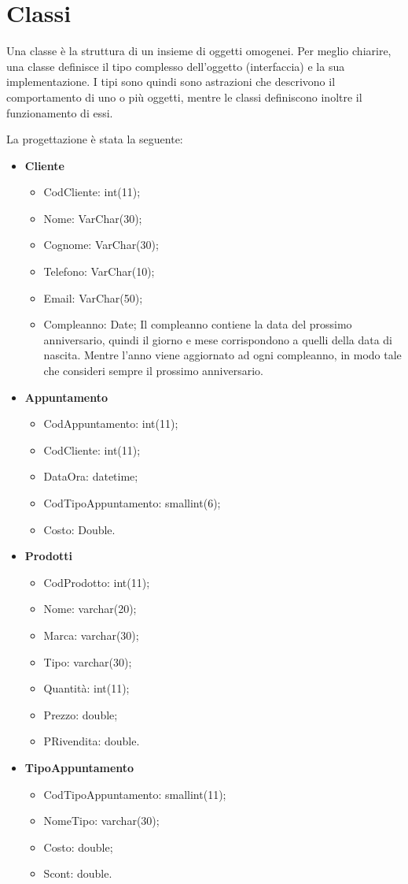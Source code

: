 \section{Classi}{
	Una classe è la struttura di un insieme di oggetti omogenei. Per meglio chiarire, una classe definisce il tipo complesso dell'oggetto (interfaccia) e la sua implementazione. I tipi sono quindi sono astrazioni che descrivono il comportamento di uno o più oggetti, mentre le classi definiscono inoltre il funzionamento di essi.
	
	La progettazione è stata la seguente: 	
	\begin{itemize}\itemsep1pt
		\item \textbf{Cliente} 
		\begin{itemize}\itemsep1pt
			\item CodCliente: int(11);
			\item Nome: VarChar(30);
			\item Cognome: VarChar(30);
			\item Telefono: VarChar(10);
			\item Email: VarChar(50);
			\item Compleanno: Date; Il compleanno contiene la data del prossimo anniversario, quindi il giorno e mese corrispondono a quelli della data di nascita. Mentre l’anno viene aggiornato ad ogni compleanno, in modo tale che consideri sempre il prossimo anniversario.
		\end{itemize}
		\item \textbf{Appuntamento}
		\begin{itemize}\itemsep1pt
			\item CodAppuntamento: int(11);
			\item CodCliente: int(11);
			\item DataOra: datetime;
			\item CodTipoAppuntamento:	smallint(6);
			\item Costo: Double.
		\end{itemize}
		\item \textbf{Prodotti}
		\begin{itemize}\itemsep1pt
			\item CodProdotto: int(11);
			\item Nome:	varchar(20);
			\item Marca: varchar(30);
			\item Tipo: varchar(30);
			\item Quantità: int(11);
			\item Prezzo: double;
			\item PRivendita: double.
		\end{itemize}
		\item \textbf{TipoAppuntamento}
		\begin{itemize}\itemsep1pt
			\item CodTipoAppuntamento: smallint(11);
			\item NomeTipo:	varchar(30);
			\item Costo: double;
			\item Scont: double.
		\end{itemize}
	\end{itemize}
}